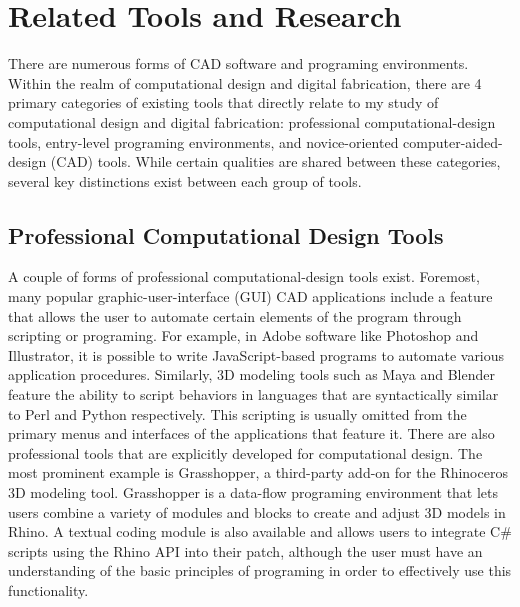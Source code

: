 \chapter{Related Tools and Research}
There are numerous forms of CAD software and programing environments. Within the realm of computational design and digital fabrication, there are 4 primary categories of existing tools  that directly relate to my study of computational design and digital fabrication: professional computational-design tools, entry-level programing environments, and novice-oriented computer-aided-design (CAD) tools. While certain qualities are shared between these categories, several key distinctions exist between each group of tools.  

\section{Professional Computational Design Tools}\label{sec:professional_computational_design_tools}
A couple of forms of professional computational-design tools exist. Foremost, many popular graphic-user-interface (GUI) CAD applications include a feature that allows the user to automate certain elements of the program through scripting or programing. For example, in Adobe software like Photoshop and Illustrator, it is possible to write JavaScript-based programs to automate various application procedures. Similarly, 3D modeling tools such as Maya and Blender feature the ability to script behaviors in languages that are syntactically similar to Perl and Python respectively. This scripting is usually omitted from the primary menus and interfaces of the applications that feature it. 
There are also professional tools that are explicitly developed for computational design. The most prominent example is Grasshopper, a third-party add-on for the Rhinoceros 3D modeling tool. Grasshopper is a data-flow programing environment that lets users combine a variety of modules and blocks to create and adjust 3D models in Rhino. A textual coding module is also available and allows users to integrate C\# scripts using the Rhino API into their patch, although the user must have an understanding of the basic principles of programing in order to effectively use this functionality. 

